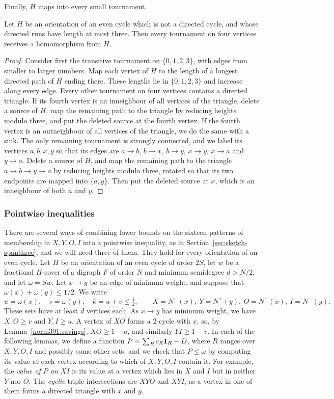 Finally, $H$ maps into every small tournament.

\begin{lemma}
\label{root391:tournaments}
Let $H$ be an orientation of an even cycle which is not a directed cycle, and whose directed runs have
length at most three. Then every tournament on four vertices receives a homomorphism from $H$.
\end{lemma}
\begin{proof}
Consider first the transitive
tournament on $\{0,1,2,3\}$, with edges from smaller to larger numbers. Map each vertex of $H$ to the
length of a longest directed path of $H$ ending there.
These lengths lie in $\{0,1,2,3\}$ and increase along every edge.
Every other tournament on four vertices contains a directed
triangle. If its fourth vertex is an inneighbour of all vertices of the triangle,
delete a source of $H$, map the remaining path to the triangle by
reducing heights modulo three, and put the deleted source at the
fourth vertex. If the fourth vertex is an outneighbour of all vertices of the triangle, we do the same with a sink. The only remaining tournament is strongly connected, and we
label its vertices $a,b,x,y$ so that its edges are
$a\to b$, $b\to x$, $b\to y$, $x\to y$,
$x\to a$ and $y\to a$. Delete a source of $H$, and map the remaining
path to the triangle $a\to b\to y\to a$ by reducing heights modulo three, rotated so that its
two endpoints are mapped into $\{a,y\}$. Then put the
deleted source at $x$, which is an inneighbour of both $a$ and $y$.
\end{proof}

\subsubsection{Pointwise inequalities}
There are several ways of combining lower bounds on the sixteen patterns of membership in $X,Y,O,I$ into a pointwise inequality, as in Section~\ref{sec:sketch-spanthree}, and we will need three of them. They hold for every orientation of an even cycle.
Let $H$ be an orientation of an even cycle of order $2S$, let $w$
be a fractional $H$-cover of a digraph $F$ of order $N$ and minimum semidegree
$d>N/2$, and let $\omega=Sw$. Let $x\to y$ be an edge of minimum weight, and suppose that $\omega(x)+\omega(y)\le1/2$. We write
\[
 u=\omega(x),\quad v=\omega(y),\quad k=u+v\le\tfrac12,
 \qquad X=N^-(x),\ Y=N^+(y),\ O=N^+(x),\ I=N^-(y).
\]
These sets have at least $d$ vertices each. As $x\to y$ has minimum weight, we have $X,O\ge v$
and $Y,I\ge u$. A vertex of $XO$ forms a $2$-cycle with $x$, so, by Lemma~\ref{norm391:savings}, $XO\ge1-u$, and similarly $YI\ge1-v$.
In each of the following lemmas, we define a function $P=\sum_Rc_R\mathbf 1_R-D$, where $R$ ranges over $X,Y,O,I$ and possibly some other sets, and we check that $P\le\omega$ by computing its value at each vertex according to which of $X,Y,O,I$ contain it. For example, the \emph{value of $P$ on $XI$} is its value at a vertex which lies in $X$ and $I$ but in neither $Y$ nor $O$. The \emph{cyclic} triple intersections are $XYO$ and $XYI$, as a vertex in one of them forms a directed triangle with $x$ and $y$.

